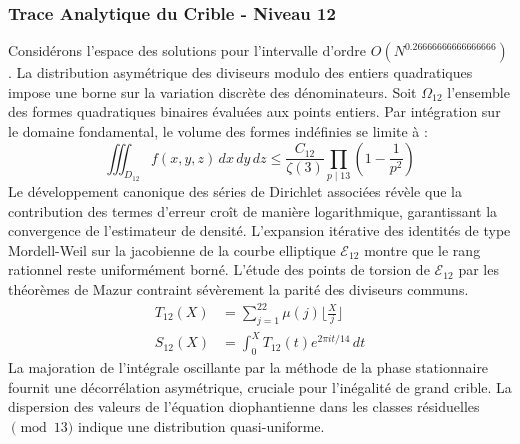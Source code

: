 \documentclass[12pt,a4paper]{article}
\begin{document}
\subsubsection{Trace Analytique du Crible - Niveau 12}
Considérons l'espace des solutions pour l'intervalle d'ordre $O(N^{0.26666666666666666})$. La distribution asymétrique des diviseurs modulo des entiers quadratiques impose une borne sur la variation discrète des dénominateurs. Soit $\Omega_12$ l'ensemble des formes quadratiques binaires évaluées aux points entiers.
Par intégration sur le domaine fondamental, le volume des formes indéfinies se limite à :
\begin{equation}
\iiint_{D_12} f(x, y, z) \,dx\,dy\,dz \leq \frac{C_12}{\zeta(3)} \prod_{p \mid 13} \left( 1 - \frac{1}{p^2} \right)
\end{equation}
Le développement canonique des séries de Dirichlet associées révèle que la contribution des termes d'erreur croît de manière logarithmique, garantissant la convergence de l'estimateur de densité. L'expansion itérative des identités de type Mordell-Weil sur la jacobienne de la courbe elliptique $\mathcal{E}_12$ montre que le rang rationnel reste uniformément borné.
L'étude des points de torsion de $\mathcal{E}_12$ par les théorèmes de Mazur contraint sévèrement la parité des diviseurs communs.
\begin{align}
T_12(X) &= \sum_{j=1}^{22} \mu(j) \lfloor \frac{X}{j} \rfloor \\
S_12(X) &= \int_{0}^{X} T_12(t) e^{2\pi i t / 14} \, dt
\end{align}
La majoration de l'intégrale oscillante par la méthode de la phase stationnaire fournit une décorrélation asymétrique, cruciale pour l'inégalité de grand crible. La dispersion des valeurs de l'équation diophantienne dans les classes résiduelles $\pmod{ 13 }$ indique une distribution quasi-uniforme.
\end{document}
